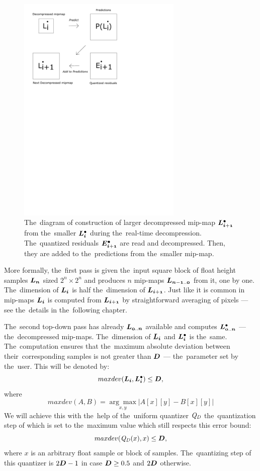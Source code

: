\begin{figure}
	\includegraphics[trim={1cm 18cm 7cm 0cm}, clip, width=0.7\textwidth]{figures/single_decomp.pdf}\centering
	\caption{The~diagram of construction of larger decompressed mip-map $\ldot{i+1}$ from the~smaller $\ldot{i}$ during the~real-time decompression. The~quantized residuals $\objdot{E}{i+1}$ are read and decompressed. Then, they are added to the~predictions from the~smaller mip-map.}
	\label{fig:single_decomp}
\end{figure}

More formally, the~first pass is given the~input square block of float height samples $\lnorm{n}$ sized $2^n \times 2^n$ and produces $n$ mip-maps $\lnorm{n-1..0}$ from it, one by one. The~dimension of $\lnorm{i}$ is half the~dimension of $\lnorm{i+1}$. Just like it is common in mip-maps $\lnorm{i}$ is computed from $\lnorm{i+1}$ by straightforward averaging of pixels --- see the~details in the~following chapter. 

The~second top-down pass has already $\lnorm{0..n}$ available and computes $\ldot{0..n}$ --- the~decompressed mip-maps. The~dimension of $\lnorm{i}$ and $\ldot{i}$ is the~same. The~computation ensures that the~maximum absolute deviation between their~corresponding samples is not greater than $\objnorm{D}{}$ --- the~parameter set by the~user. This will be denoted by:
$$maxdev(\lnorm{i}, \ldot{i}) \leq \objnorm{D}{},$$
where
$$maxdev(A, B) = \underset{x, y}{\arg\max}|A[x][y] - B[x][y]|$$
We will achieve this with the~help of the~uniform quantizer $\mathit{Q_{D}}$ the~quantization step of which is set to the~maximum value which still respects this error bound:
$$maxdev(\dnorm(x), x) \leq \objnorm{D}{},$$
where $x$ is an arbitrary float sample or block of samples.
The~quantizing step of this quantizer is $2\objnorm{D}{} - 1$ in case $\objnorm{D}{} \geq 0.5$ and $2\objnorm{D}{}$ otherwise.


